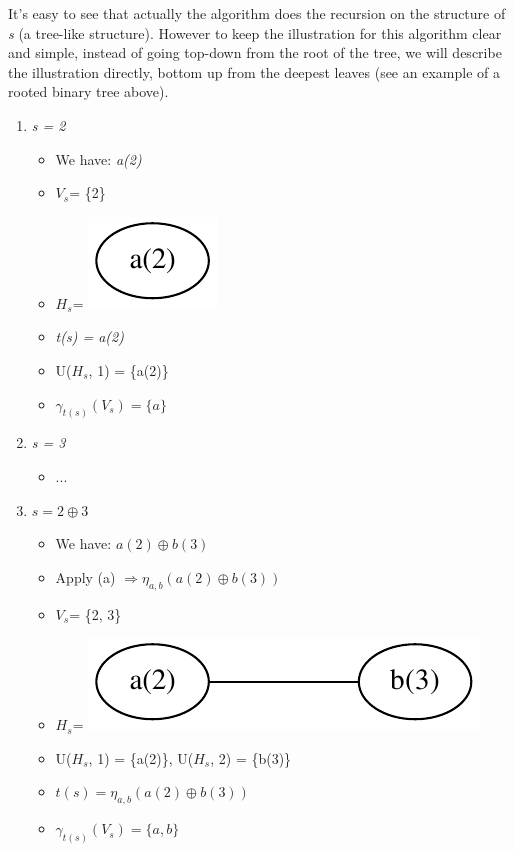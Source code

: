 \documentclass[a4paper, 12pt]{article}
\begin{document}
It's easy to see that actually the algorithm does the recursion on the structure of \textit {s} (a tree-like structure). However to keep the illustration for this algorithm clear and simple, instead of going
top-down from the root of the tree, we will describe the illustration directly, bottom up from the deepest leaves (see an example of a rooted binary tree above).\pagebreak
\begin{enumerate}
\item \textit {s = 2}

\begin{itemize}
\item We have: \textit {a(2)}
\item {$V_s$}= \{2\}
\item {$H_s$}= \includegraphics[scale=0.5]{image/example1}
\item \textit {t(s) = a(2)}
\item U({$H_s$}, 1) = \{a(2)\}
\item $\gamma_{t(s)}(V_{s})=\{a\}$ 
\end{itemize}

\item \textit {s = 3}
\begin{itemize}
\item ...
\end{itemize}

\item $s=2\oplus3$
\begin{itemize}
\item We have: $a(2)\oplus b(3)$
\item Apply (a) $\Longrightarrow\eta_{a,b}(a(2)\oplus b(3))$
\item {$V_s$}= \{2, 3\} 
\item {$H_s$}= \includegraphics[scale=0.5]{image/example3}
\item U({$H_s$}, 1) = \{a(2)\}, U({$H_s$}, 2) =
\{b(3)\} 
\item $t(s)=\eta_{a,b}(a(2)\oplus b(3))$ 
\item $\gamma_{t(s)}(V_{s})=\{a,b\}$ 
\end{itemize}


\end{enumerate}
\end{document}
